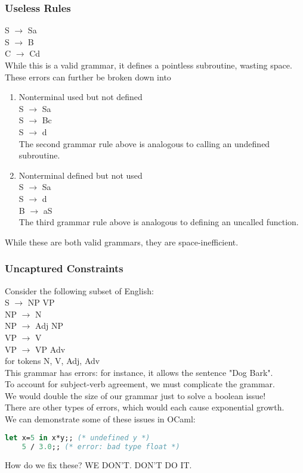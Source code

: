 \documentclass[../../lecture_notes.tex]{subfiles}
\begin{document}
\subsubsection*{Useless Rules}
	\indent S $\rightarrow$ Sa\\
	\indent S $\rightarrow$ B \\
	\indent C $\rightarrow$ Cd \\
While this is a valid grammar, it defines a pointless subroutine, wasting space.\\
These errors can further be broken down into 
\begin{enumerate} [itemsep=0mm]
	\item Nonterminal used but not defined\\
			S $\rightarrow$ Sa\\
			S $\rightarrow$ Bc\\
			S $\rightarrow$ d\\
		The second grammar rule above is analogous to calling an undefined subroutine.
	\item Nonterminal defined but not used\\
			S $\rightarrow$ Sa\\
			S $\rightarrow$ d\\
			B $\rightarrow$ aS\\
		The third grammar rule above is analogous to defining an uncalled function.
\end{enumerate}
While these are both valid grammars, they are space-inefficient.
\subsubsection*{Uncaptured Constraints}
Consider the following subset of English:\\
	\indent S $\rightarrow$ NP VP\\
	\indent NP $\rightarrow$ N\\
	\indent NP $\rightarrow$ Adj NP\\
	\indent VP $\rightarrow$ V\\
	\indent VP $\rightarrow$ VP Adv\\
	\indent for tokens {N, V, Adj, Adv}\\
This grammar has errors: for instance, it allows the sentence "Dog Bark".\\
To account for subject-verb agreement, we must complicate the grammar.\\
We would double the size of our grammar just to solve a boolean issue!\\

There are other types of errors, which would each cause exponential growth.\\
We can demonstrate some of these issues in OCaml:\\
\begin{lstlisting}[language=ML]
	let x=5 in x*y;; (* undefined y *)
	5 / 3.0;; (* error: bad type float *)
\end{lstlisting}
How do we fix these? WE DON'T.  DON'T DO IT.\\
\end{document}
